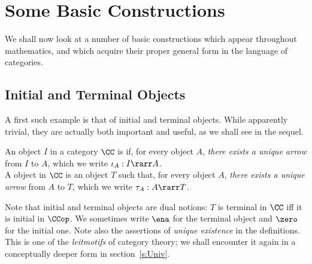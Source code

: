 \documentclass{svmult}
\begin{document}
\section{Some Basic Constructions}\label{s:BasConstr}

We shall now look at a number of basic constructions which appear throughout mathematics, and which acquire their proper general form in the language of categories.

\subsection{Initial and Terminal Objects}

A first such example is that of initial and terminal objects. While apparently trivial, they are actually both important and useful, as we shall see in the sequel.

\begin{mydefinition}
An object $I$ in a category $\CC$ is  if, for every object $A$, \emph{there exists a unique arrow} from $I$ to $A$, which we write
$\iota_A : I \rarr A$. \\
A  object in $\CC$ is an object $T$ such that, for every object $A$, \emph{there exists a unique arrow} from $A$ to $T$, which we write $\tau_A: A \rarr T$.\deq
\end{mydefinition}
%
Note that initial and terminal objects are dual notions: $T$ is terminal in $\CC$ iff it is initial in $\CCop$. We sometimes write $\ena$ for the
terminal object and $\zero$ for the initial one.
%
Note also the assertions of \emph{unique existence} in the definitions. This is one of the \textit{leitmotifs} of category theory; we shall encounter it again in a conceptually deeper form in section~\ref{s:Univ}.
\end{document}

